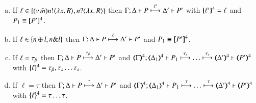 \begin{proposition}
\begin{enumerate}
\begin{enumerate}[a)]
				\item	If $\ell \in \{(\nu\, \tilde{m}) n ! \langle \lambda x.\,R \rangle, n ? \langle \lambda x.\,R \rangle\}$
					then
					$\Gamma; \Delta \vdash P \stackrel{\ell'}{\longmapsto} \Delta' \vdash P'$
					with $\{\!\!\{\ell'\}\!\!\}^{4} = \ell$ and $P_1 \equiv [\!\![P']\!\!]^4$.

				\item	If $\ell \in \{n \oplus l, n \& l\}$
					then
					$\Gamma; \Delta \vdash P \stackrel{\ell}{\longmapsto} \Delta' \vdash P'$ and $P_1 \equiv [\!\![P']\!\!]^4$.

				\item	If $\ell = \tau_{\beta}$ then
					$\Gamma; \Delta \vdash P \stackrel{\tau_{\beta}}{\longmapsto} \Delta' \vdash P'$ and
					$\horel{\tmap{\Gamma}{4}}{\tmap{\Delta_1}{4}}{P_1}{\hby{\stau} \dots \hby{\stau}}
					{\tmap{\Delta'}{4}}{\tmap{P'}{4}}$ with $\{\!\!\{\ell\}\!\!\}^{4} = \tau_{\beta}, \tau_{s} \dots \tau_{s}$.

				\item	If $\ell = \tau$ then
					$\Gamma; \Delta \vdash P \stackrel{\tau}{\longmapsto} \Delta' \vdash P'$ and
					$\horel{\tmap{\Gamma}{4}}{\tmap{\Delta_1}{4}}{P_1}{\hby{\tau} \dots \hby{\tau}}
					{\tmap{\Delta'}{4}}{\tmap{P'}{4}}$ with $\{\!\!\{\ell\}\!\!\}^{4} = \tau \dots \tau$.
			\end{enumerate}
	\end{enumerate}
\end{proposition}

